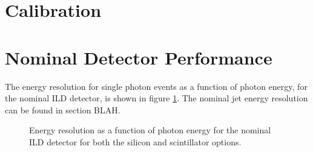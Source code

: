 \section{Calibration}


\section{Nominal Detector Performance}
The energy resolution for single photon events as a function of photon energy, for the nominal ILD detector, is shown in figure \ref{fig:ecalnominalres}.  The nominal jet energy resolution can be found in section BLAH.

\begin{figure}
\centering
{}
\caption[Energy resolution as a function of photon energy for the nominal ILD detector for both the silicon and scintillator options.]{Energy resolution as a function of photon energy for the nominal ILD detector for both the silicon and scintillator options.}
\label{fig:ecalnominalres}
\end{figure}

